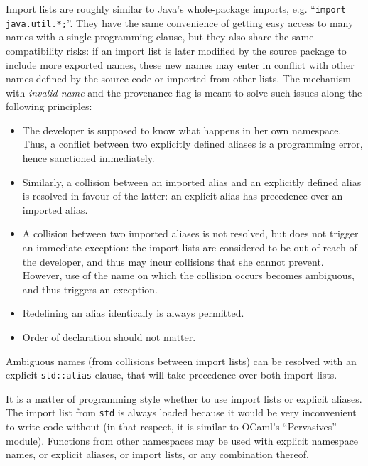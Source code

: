 \begin{rationale}

Import lists are roughly similar to Java's whole-package imports, e.g.
``\verb|import java.util.*;|''. They have the same convenience of
getting easy access to many names with a single programming clause, but
they also share the same compatibility risks: if an import list is later
modified by the source package to include more exported names, these new
names may enter in conflict with other names defined by the source code
or imported from other lists. The mechanism with \emph{invalid-name} and
the provenance flag is meant to solve such issues along the following
principles:
\begin{itemize}

    \item The developer is supposed to know what happens in her own
    namespace. Thus, a conflict between two explicitly defined aliases
    is a programming error, hence sanctioned immediately.

    \item Similarly, a collision between an imported alias and an
    explicitly defined alias is resolved in favour of the latter: an
    explicit alias has precedence over an imported alias.

    \item A collision between two imported aliases is not resolved,
    but does not trigger an immediate exception: the import lists are
    considered to be out of reach of the developer, and thus may
    incur collisions that she cannot prevent. However, use of the name
    on which the collision occurs becomes ambiguous, and thus triggers
    an exception.

    \item Redefining an alias identically is always permitted.

    \item Order of declaration should not matter.

\end{itemize}

Ambiguous names (from collisions between import lists) can be resolved
with an explicit \verb|std::alias| clause, that will take precedence
over both import lists.

It is a matter of programming style whether to use import lists or
explicit aliases. The import list from \verb|std| is always loaded
because it would be very inconvenient to write code without (in that
respect, it is similar to OCaml's ``Pervasives'' module). Functions
from other namespaces may be used with explicit namespace names, or
explicit aliases, or import lists, or any combination thereof.

\end{rationale}

